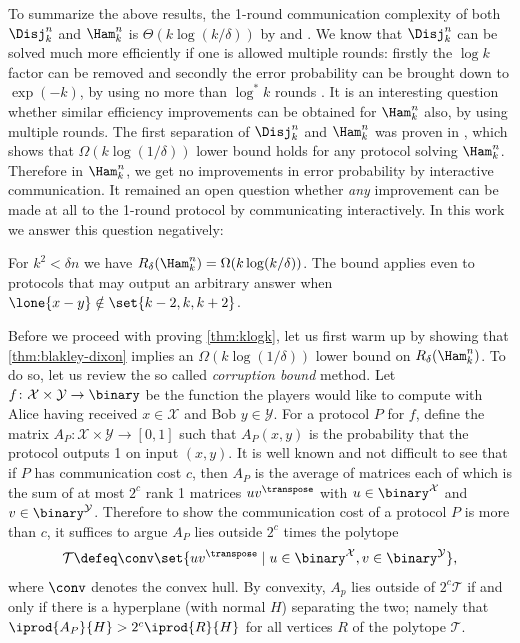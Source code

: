 

To summarize the above results, the 1-round communication 
complexity of both $\Disj^n_k$ and $\Ham^n_k$ is 
$\Theta(k\log(k/\delta))$ by 
\cite{BuhrmanGMW2012, Saglam2011, JayramW2011} and 
\cite{HuangSZZ2006}. We know that $\Disj^n_k$ can be solved 
much more efficiently if one is allowed multiple rounds:
firstly the $\log k$ factor can be removed \cite{HastadW2007} 
and secondly the error probability can be brought down to 
$\exp(-k)$, by using no more than $\log^* k$ rounds 
\cite{SaglamT2013}. It is an interesting question whether 
similar efficiency improvements can be obtained for $\Ham^n_k$ 
also, by using multiple rounds.
The first separation of $\Disj^n_k$ and $\Ham^n_k$ was proven
in \cite{BlaisBG2014}, which shows that $\Omega(k\log(1/\delta))$
lower bound holds for any protocol solving $\Ham^n_k$. 
Therefore in $\Ham^n_k$, we get no improvements in error probability
by interactive communication. It remained an open 
question whether {\em any} improvement can be made 
at all to the 1-round protocol by communicating interactively.
In this work we answer this question negatively: 

\begingroup
\def\thetheorem{\ref{thm:klogk}}
\begin{theorem}[restated]
For $k^2<\delta n$ we have 
$R_{\delta}(\Ham^n_k) = \Omega(k\log (k/\delta))$.
The bound applies even to protocols that may
output an arbitrary answer when $\lone{x-y} \notin \set{k-2, k,k+2}$.
\end{theorem}
\addtocounter{theorem}{-1}
\endgroup
Before we proceed with proving \autoref{thm:klogk}, let us
first warm up by showing that \autoref{thm:blakley-dixon} 
implies an  $\Omega(k\log(1/\delta))$ lower bound on 
$R_\delta(\Ham^n_k)$.
To do so, let us review the so called {\em corruption bound}
method. Let  $f\colon\mathcal{X}\times\mathcal{Y}\to\binary$ 
be the function the players would like to compute with 
Alice having received $x\in \mathcal{X}$ and Bob $y\in \mathcal{Y}$. 
For a protocol $P$ for $f$, define the matrix 
$A_P\colon\mathcal{X}\times\mathcal{Y}\to[0,1]$ 
such that $A_P(x,y)$ is the probability
that the protocol outputs 1 on input $(x,y)$.
It is well known and not difficult to see that
if $P$ has communication cost $c$, then $A_P$ is the
average of matrices each of which is the sum of at most
$2^c$ rank 1 matrices $u v^\transpose$ with 
$u\in \binary^\mathcal{X}$ and $v\in\binary^\mathcal{Y}$.
Therefore to show the communication cost of a protocol
$P$ is more than $c$, it suffices to argue $A_P$ lies
outside $2^c$ times the polytope
\begin{align*}
\mathcal{T}\defeq 
\conv\set{uv^\transpose\mid 
u\in\binary^\mathcal{X}, v\in\binary^\mathcal{Y}},
\end{align*}
where $\conv$ denotes the convex hull. By convexity, 
$A_p$ lies outside of $2^c\mathcal{T}$ if and only if there 
is a hyperplane (with normal $H$) separating the two; 
namely that $\iprod{A_P}{H}>2^c\iprod{R}{H}$ for all 
vertices $R$ of the polytope $\mathcal{T}$.

